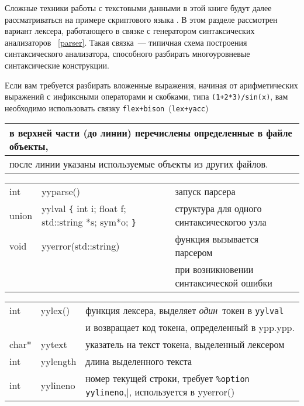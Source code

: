 \secdown

Сложные техники работы с текстовыми данными в этой книге будут далее 
рассматриваться на примере скриптового языка \bi. В этом разделе
рассмотрен вариант лексера, работающего в связке с генератором синтаксических
анализаторов \ \ref{parser}. Такая связка\ --- типичная схема
построения синтаксического анализатора, способного разбирать многоуровневые
синтаксические конструкции.

\begin{framed}
Если вам требуется разбирать вложенные выражения, начиная от арифметических
выражений с инфиксными операторами и скобками, типа \verb|(1+2*3)/sin(x)|,
вам необходимо использовать связку \verb|flex+bison|\ (\verb|lex+yacc|)   
\end{framed}

\secdown


\begin{tabular}{l}
в верхней части (до линии) перечислены определенные в файле объекты,\\
\hline
после линии указаны используемые объекты из других файлов. 
\end{tabular}


\begin{tabular}{l l l}
int & yyparse() & запуск парсера \\
union & yylval \verb|{| int i; float f; std::string *s; sym*o; \verb|}| &
структура для одного синтаксическогоо узла \\
\hline
void & yyerror(std::string) &
функция вызывается парсером\\&& при возникновении синтаксической ошибки \\
\end{tabular}


\begin{tabular}{l l l}
int & yylex() & функция лексера, выделяет \emph{один}\ токен в \verb|yylval|\\
&&и возвращает код токена, определенный в ypp.ypp.\\
char* & yytext & указатель на текст токена, выделенный лексером \\
int & yylength & длина выделенного текста\\
int & yylineno & номер текущей строки, требует \verb|%option yylineno|,
используется в yyerror()\\
\end{tabular}

